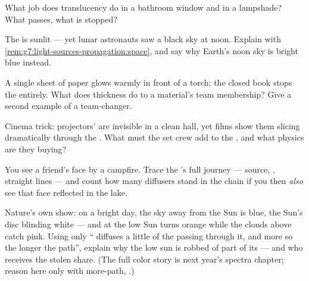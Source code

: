 \begin{exercise}[$\star$]\label{exo:g7:light-sources-propagation:7}
What job does translucency do in a bathroom window and in a
lampshade? What passes, what is stopped?
\end{exercise}

\begin{exercise}[$\star$]\label{exo:g7:light-sources-propagation:8}
The  is sunlit --- yet lunar astronauts saw a black sky at
noon. Explain with
\cref{rem:g7:light-sources-propagation:space}, and say why
Earth's noon sky is bright blue instead.
\end{exercise}

\begin{exercise}[$\star\star$]\label{exo:g7:light-sources-propagation:9}
A single sheet of paper glows warmly in front of a torch; the
closed book stops the  entirely. What does thickness do to
a material's team membership? Give a second example of a
team-changer.
\end{exercise}

\begin{exercise}[$\star\star$]\label{exo:g7:light-sources-propagation:10}
Cinema trick: projectors'  are invisible in a clean hall,
yet films show them slicing dramatically through the . What
must the set crew add to the , and what physics are they
buying?
\end{exercise}

\begin{exercise}[$\star\star$]\label{exo:g7:light-sources-propagation:11}
You see a friend's face by a campfire. Trace the 's full
journey --- source, , straight lines --- and count how
many diffusers stand in the chain if you then \emph{also} see
that face reflected in the lake.
\end{exercise}

\begin{exercise}[$\star\star\star$]\label{exo:g7:light-sources-propagation:12}
Nature's own  show: on a bright day, the sky away from the
Sun is blue, the Sun's disc blinding white --- and at  the
low Sun turns orange while the clouds above catch pink. Using
only `` diffuses a little of the  passing through it,
and more so the longer the path'', explain why the low sun is
robbed of part of its  --- and who receives the stolen
share. (The full color story is next year's spectra chapter;
reason here only with more-path, .)
\end{exercise}

